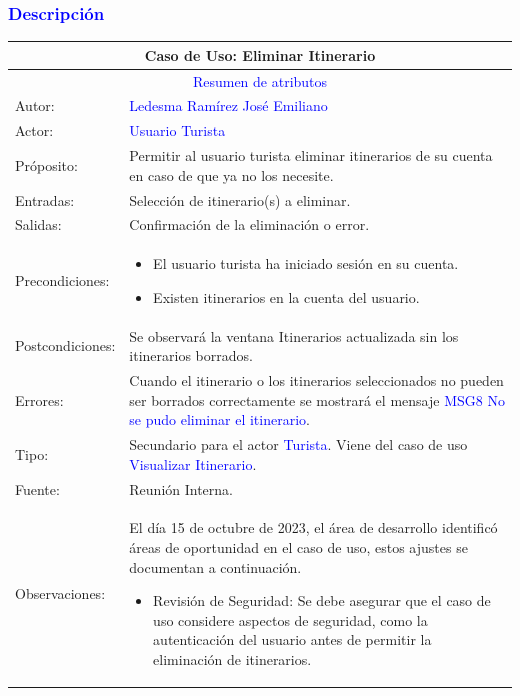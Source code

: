 \subsubsection{\textcolor{blue}{Descripción}}
\begin{tabularx}{16cm}{||l|X||}
	\hline
	\multicolumn{2}{||c||}{\textbf{Caso de Uso: Eliminar Itinerario}} \\
	\hline
	\multicolumn{2}{||c||}{\textcolor{blue}{Resumen de atributos}} \\
 \hline
	{Autor:} & {\textcolor{blue}{Ledesma Ramírez José Emiliano}} \\
	\hline
	\hline
	{Actor:} & {\textcolor{blue}{Usuario Turista}} \\
	\hline
	{Próposito:} & Permitir al usuario turista eliminar itinerarios de su cuenta en caso de que ya no los necesite.\\
	\hline
	{Entradas:} & Selección de itinerario(s) a eliminar.
        \\
	\hline
	{Salidas:} & Confirmación de la eliminación o error.\\
	\hline
	{Precondiciones:} & 
        \begin{itemize}
            \item El usuario turista ha iniciado sesión en su cuenta.
            \item Existen itinerarios en la cuenta del usuario.
        \end{itemize}\\ 
	\hline
	{Postcondiciones:} & Se observará la ventana Itinerarios actualizada sin los itinerarios borrados.\\
	\hline
	{Errores:} & Cuando el itinerario o los itinerarios seleccionados no pueden ser borrados correctamente se mostrará el mensaje {\textcolor{blue}{MSG8 No se pudo eliminar el itinerario}}. \\
	\hline
	{Tipo:} & Secundario para el actor {\textcolor{blue}{Turista}}. Viene del caso de uso {\textcolor{blue}{Visualizar Itinerario}}.\\
	\hline
	{Fuente:} & Reunión Interna. \\
	\hline
	{Observaciones:} & El día 15 de octubre de 2023, el área de desarrollo identificó áreas de oportunidad en el caso de uso, estos ajustes se documentan a continuación.
    \begin{itemize}
        \item Revisión de Seguridad: Se debe asegurar que el caso de uso considere aspectos de seguridad, como la autenticación del usuario antes de permitir la eliminación de itinerarios. 

\end{itemize}
\end{tabularx}
